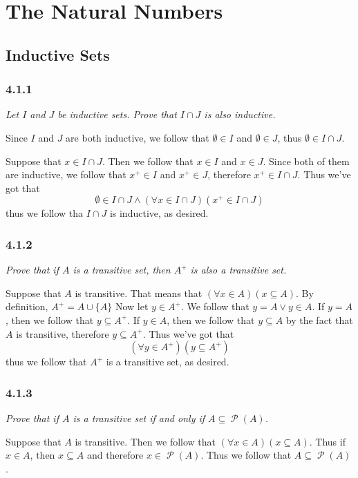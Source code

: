 \documentclass[11pt,oneside,titlepage]{book}
\DeclareMathOperator \pow {\mathcal {P}}
\begin{document}
\chapter{The Natural Numbers}

\section{Inductive Sets}

\subsection*{4.1.1}

\textit{Let $I$ and $J$ be inductive sets. Prove that $I \cap J$ is also inductive.}

Since $I$ and $J$ are both inductive, we follow that $\emptyset \in I$ and $\emptyset \in J$,
thus $\emptyset \in I \cap J$.

Suppose that $x \in I \cap J$. Then we follow that $x \in I$ and $x \in J$. Since both of them
are inductive, we follow that $x^+ \in I$ and $x^+ \in J$, therefore $x^+ \in I \cap J$. Thus
we've got that
$$\emptyset \in I \cap J \land (\forall x \in I \cap J)(x^+ \in I \cap J)$$
thus we follow tha $I \cap J$ is inductive, as desired.

\subsection*{4.1.2}

\textit{Prove that if $A$ is a transitive set, then $A^+$ is also a transitive set.}

Suppose that $A$ is transitive. That means that $(\forall x \in A)(x \subseteq A)$.
By definition, $A^+ = A \cup \{A\}$
Now let $y \in A^+$. We follow that $y = A \lor y \in A$. If $y = A$, then we follow that
$y \subseteq A^+$. If $y \in A$, then we follow that $y \subseteq A$ by the fact that
$A$ is transitive, therefore $y \subseteq A^+$. Thus we've got that
$$(\forall y \in A^+)(y \subseteq A^+)$$
thus we follow that $A^+$ is a transitive set, as desired.

\subsection*{4.1.3}

\textit{Prove that if $A$ is a transitive set if and only if $A \subseteq \pow(A)$.}

Suppose that $A$ is transitive. Then we follow that $(\forall x \in A)(x \subseteq A)$. Thus
if $x \in A$, then $x \subseteq A$ and therefore $x \in \pow(A)$. Thus we follow that
$A \subseteq \pow(A)$.
\end{document}
